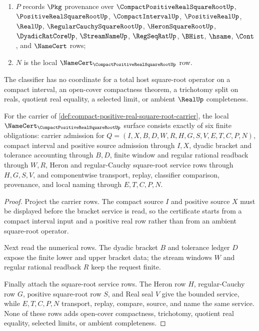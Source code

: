 \begin{definition}
\begin{enumerate}
\item $P$ records $\Pkg$ provenance over $\CompactPositiveRealSquareRootUp$, $\PositiveRealSquareRootUp$, $\CompactIntervalUp$, $\PositiveRealUp$, $\RealUp$, $\RegularCauchySquareRootUp$, $\HeronSquareRootUp$, $\DyadicRatCoreUp$, $\StreamNameUp$, $\RegSeqRatUp$, $\BHist$, $\hsame$, $\Cont$, and $\NameCert$ rows;
\item $N$ is the local $\NameCert_{\CompactPositiveRealSquareRootUp}$ row.
\end{enumerate}
The classifier has no coordinate for a total host square-root operator on a compact interval, an open-cover compactness theorem, a trichotomy split on reals, quotient real equality, a selected limit, or ambient $\RealUp$ completeness.
\end{definition}

\begin{theorem}
\label{thm:compact-positive-real-square-root-namecert-obligations}
For the carrier of \autoref{def:compact-positive-real-square-root-carrier}, the local $\NameCert_{\CompactPositiveRealSquareRootUp}$ surface consists exactly of six finite obligations: carrier admission for $Q=(I,X,B,D,W,R,H,G,S,V,E,T,C,P,N)$, compact interval and positive source admission through $I,X$, dyadic bracket and tolerance accounting through $B,D$, finite window and regular rational readback through $W,R$, Heron and regular-Cauchy square-root service rows through $H,G,S,V$, and componentwise transport, replay, classifier comparison, provenance, and local naming through $E,T,C,P,N$.
\end{theorem}
\begin{proof}
Project the carrier rows. The compact source $I$ and positive source $X$ must be displayed before the bracket service is read, so the certificate starts from a compact interval input and a positive real row rather than from an ambient square-root operator.

Next read the numerical rows. The dyadic bracket $B$ and tolerance ledger $D$ expose the finite lower and upper bracket data; the stream windows $W$ and regular rational readback $R$ keep the request finite.

Finally attach the square-root service rows. The Heron row $H$, regular-Cauchy row $G$, positive square-root row $S$, and Real seal $V$ give the bounded service, while $E,T,C,P,N$ transport, replay, compare, source, and name the same service. None of these rows adds open-cover compactness, trichotomy, quotient real equality, selected limits, or ambient completeness.
\end{proof}

